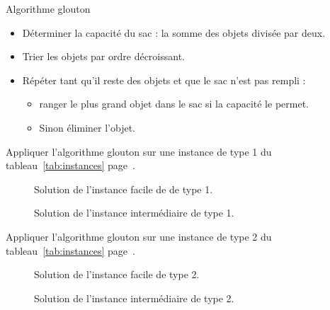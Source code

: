 \documentclass[11pt]{article}
\newcommand{\instance}[1]{instance de type #1 du tableau~\ref{tab:instances} page~\pageref{tab:instances}}
\begin{document}
  \begin{algorithme}{Algorithme glouton}
    \label{algo:gs}
    \begin{itemize}
    \item Déterminer la capacité du sac : la somme des objets divisée par deux.
    \item Trier les objets par ordre décroissant.
    \item  Répéter tant qu'il reste des objets et que le sac n'est pas rempli :
      \begin{itemize}
      \item ranger le plus grand objet dans le sac si la capacité le permet.
      \item Sinon éliminer l'objet.
      \end{itemize}
  \end{itemize}
  \end{algorithme}



  \begin{exercice}{}
    Appliquer l'algorithme glouton sur une \instance{1}.
  \end{exercice}

  \begin{figure}[htbp]
    \centering
    \resizebox{0.6\linewidth}{!}{
      
    }
    \caption{Solution de l'instance facile de de type 1.}
  \end{figure}

    \begin{figure}[htbp]
    \centering
    \resizebox{0.6\linewidth}{!}{
      
    }
    \caption{Solution de l'instance intermédiaire de type 1.}
  \end{figure}

\begin{exercice}{}
    Appliquer l'algorithme glouton sur une \instance{2}.
  \end{exercice}

  \begin{figure}[htbp]
    \centering
    \resizebox{0.6\linewidth}{!}{
      
    }
    \caption{Solution de l'instance facile de type 2.}
  \end{figure}

  \begin{figure}[htbp]
    \centering
    \resizebox{0.6\linewidth}{!}{
      
    }
    \caption{Solution de l'instance intermédiaire de type 2.}
  \end{figure}
\end{document}
